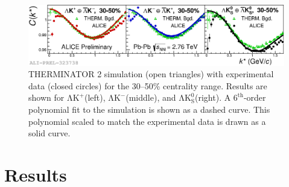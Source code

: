 \documentclass{svproc}
\newcommand{\LamKchP}{$\mathrm{\Lambda}\mathrm{K^{+}}$\xspace}
\newcommand{\LamKchM}{$\mathrm{\Lambda}\mathrm{K^{-}}$\xspace}
\newcommand{\LamKs}{$\mathrm{\Lambda}\mathrm{K^{0}_{S}}$\xspace}
\begin{document}
\begin{figure}[h]
  \centering
  \includegraphics[width=\textwidth]{./2019-06-11-BgdwFitOnly_RandomEPs_NumWeight1_Full_AllAnwConj_3050.eps}
  \caption[Backgrounds with THERMINATOR 2]
  {
  THERMINATOR 2 simulation (open triangles) with experimental data (closed circles) for the 30--50\% centrality range.  
  Results are shown for \LamKchP (left), \LamKchM (middle), and \LamKs (right).
  A $6^{\mathrm{th}}$-order polynomial fit to the simulation is shown as a dashed curve.  
  This polynomial scaled to match the experimental data is drawn as a solid curve.
  }
  \label{fig:BgdswTHERM}
\end{figure} 

\section{Results}
\label{sec:Results}
\end{document}
